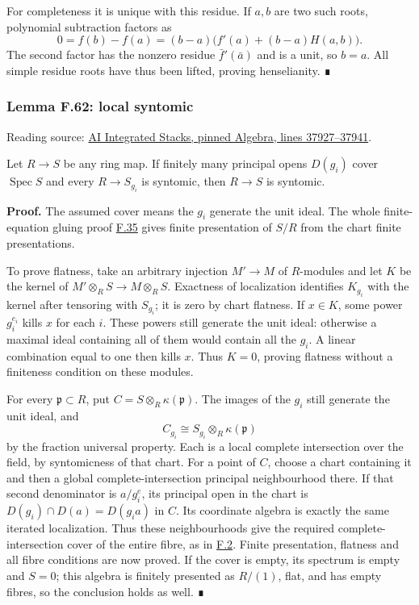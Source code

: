 \documentclass[11pt,a4paper,openany]{report}
\begin{document}
For completeness it is unique with this residue. If \(a,b\) are two such roots, polynomial subtraction factors as \[0=f(b)-f(a)=(b-a)\bigl(f'(a)+(b-a)H(a,b)\bigr).\] The second factor has the nonzero residue \(\bar f'(\bar a)\) and is a unit, so \(b=a\). All simple residue roots have thus been lifted, proving henselianity. ∎

\label{AG-RG-S05-algebra-lemma-local-syntomic}

\subsubsection{Lemma F.62: local syntomic}\label{AG-RG-S05-lemma-f.62-local-syntomic}

Reading source: \href{https://github.com/KokunoYumeto/unofficial-stacks-project-ai-drafts/blob/565b10e987aba5969b21145a0833f42d69f96790/algebra.tex\#L37927-L37941}{AI Integrated Stacks, pinned Algebra, lines 37927--37941}.

Let \(R\to S\) be any ring map. If finitely many principal opens \(D(g_i)\) cover \(\operatorname{Spec}S\) and every \(R\to S_{g_i}\) is syntomic, then \(R\to S\) is syntomic.

\textbf{Proof.} The assumed cover means the \(g_i\) generate the unit ideal. The whole finite-equation gluing proof \hyperref[AG-RG-S05-algebra-lemma-cover-upstairs]{F.35} gives finite presentation of \(S/R\) from the chart finite presentations.

To prove flatness, take an arbitrary injection \(M'\to M\) of \(R\)-modules and let \(K\) be the kernel of \(M'\otimes_RS\to M\otimes_RS\). Exactness of localization identifies \(K_{g_i}\) with the kernel after tensoring with \(S_{g_i}\); it is zero by chart flatness. If \(x\in K\), some power \(g_i^{e_i}\) kills \(x\) for each \(i\). These powers still generate the unit ideal: otherwise a maximal ideal containing all of them would contain all the \(g_i\). A linear combination equal to one then kills \(x\). Thus \(K=0\), proving flatness without a finiteness condition on these modules.

For every \(\mathfrak p\subset R\), put \(C=S\otimes_R\kappa(\mathfrak p)\). The images of the \(g_i\) still generate the unit ideal, and \[C_{g_i}\cong S_{g_i}\otimes_R\kappa(\mathfrak p)\] by the fraction universal property. Each is a local complete intersection over the field, by syntomicness of that chart. For a point of \(C\), choose a chart containing it and then a global complete-intersection principal neighbourhood there. If that second denominator is \(a/g_i^e\), its principal open in the chart is \(D(g_i)\cap D(a)=D(g_i a)\) in \(C\). Its coordinate algebra is exactly the same iterated localization. Thus these neighbourhoods give the required complete-intersection cover of the entire fibre, as in \hyperref[AG-RG-S05-algebra-definition-lci-field]{F.2}. Finite presentation, flatness and all fibre conditions are now proved. If the cover is empty, its spectrum is empty and \(S=0\); this algebra is finitely presented as \(R/(1)\), flat, and has empty fibres, so the conclusion holds as well. ∎
\end{document}
